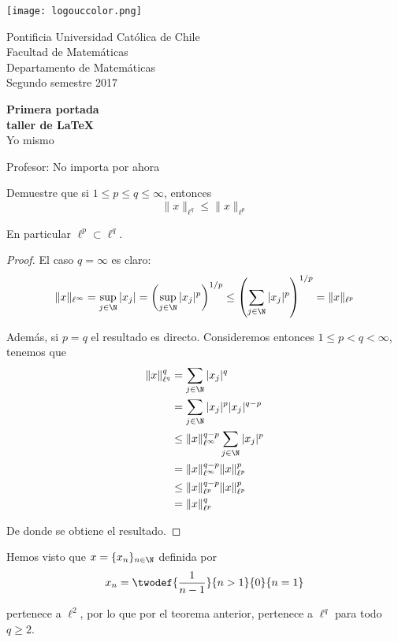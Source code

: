 \documentclass{article}
\begin{document}
\begin{titlepage}
	\begin{minipage}{2.5cm}
		\texttt{[image: logouccolor.png]}
	\end{minipage}
	\begin{minipage}{13 cm}
		\begin{flushleft}
   			\noindent\large{\sc
				Pontificia Universidad Católica de Chile \\ 
		     		Facultad de Matemáticas \\ 
		     		Departamento de Matemáticas \\ 
				Segundo semestre 2017
		     	}
		\end{flushleft}
	\end{minipage}
	
\begin{center}
	\vspace*{\fill}
		\Huge\textbf{Primera portada}	\\
		\Huge\textbf{taller de \LaTeX}	\\
		\LARGE{Yo mismo} \\
	\vspace*{\fill}
		
	\vfill
		
	\Large{Profesor: No importa por ahora}
\end{center}
\end{titlepage}

\begin{teo} Demuestre que si $1 \leq p \leq q \leq \infty$, entonces
	$$\|x\|_{\ell^{q}} \leq \|x\|_{\ell^{p}}$$
	
En particular $\ell^{p} \subset \ell^{q}$.
\end{teo}

\begin{proof} El caso $q = \infty$ es claro:
	$$\|x\|_{\ell^{\infty}} 
		= 	\sup_{j \in \N} |x_{j}|
		= 	\left(\sup_{j \in \N} |x_{j}|^{p}\right)^{1/p} 
		\leq	\left(\sum_{j \in \N} |x_{j}|^{p}\right)^{1/p} = \|x\|_{\ell^{p}}
	$$

Además, si $p = q$ el resultado es directo. Consideremos entonces $1 \leq p < q < \infty$, tenemos que
	\begin{align*}
		\|x\|_{\ell^{q}}^{q}
			&=		\sum_{j \in \N} |x_{j}|^{q}	\\
			&=		\sum_{j \in \N} |x_{j}|^{p} |x_{j}|^{q-p}	\\
			&\leq		\|x\|^{q-p}_{\ell^{\infty}} \sum_{j \in \N} |x_{j}|^{p}	\\
			&=		\|x\|^{q-p}_{\ell^{\infty}} \|x\|_{\ell^{p}}^{p}	\\
			&\leq		\|x\|^{q-p}_{\ell^{p}} \|x\|_{\ell^{p}}^{p}	\\
			&=		\|x\|_{\ell^{p}}^{q}		 
	\end{align*}

De donde se obtiene el resultado.
\end{proof}                                          

\begin{obst} Hemos visto que $x = \{x_{n}\}_{n \in \N}$ definida por
	$$x_{n} = \twodef	{\frac{1}{n-1}}{n > 1}
					{0}{n = 1}$$

pertenece a $\ell^{2}$, por lo que por el teorema anterior, pertenece a $\ell^{q}$ para todo $q \geq 2$.
\end{obst}
\end{document}
